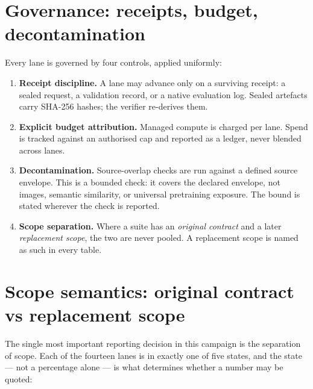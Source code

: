 \section{Governance: receipts, budget, decontamination}

Every lane is governed by four controls, applied uniformly:

\begin{enumerate}[leftmargin=1.6em,itemsep=3pt]
  \item \textbf{Receipt discipline.} A lane may advance only on a surviving
  receipt: a sealed request, a validation record, or a native evaluation log.
  Sealed artefacts carry SHA-256 hashes; the verifier re-derives them.
  \item \textbf{Explicit budget attribution.} Managed compute is charged per lane.
  Spend is tracked against an authorised cap and reported as a ledger, never
  blended across lanes.
  \item \textbf{Decontamination.} Source-overlap checks are run against a defined
  source envelope. This is a bounded check: it covers the declared envelope, not
  images, semantic similarity, or universal pretraining exposure. The bound is
  stated wherever the check is reported.
  \item \textbf{Scope separation.} Where a suite has an \emph{original contract}
  and a later \emph{replacement scope}, the two are never pooled. A replacement
  scope is named as such in every table.
\end{enumerate}

\section{Scope semantics: original contract vs replacement scope}

The single most important reporting decision in this campaign is the separation of
scope. Each of the fourteen lanes is in exactly one of five states, and the state
--- not a percentage alone --- is what determines whether a number may be quoted:

